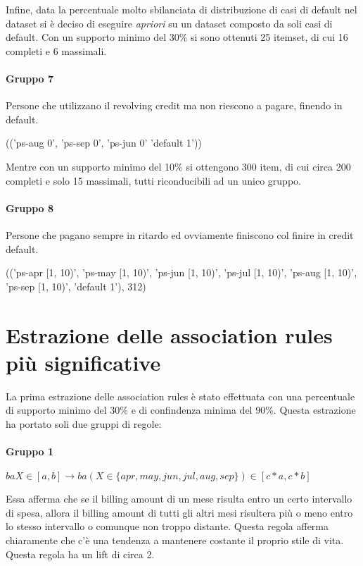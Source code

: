 Infine, data la percentuale molto sbilanciata di distribuzione di casi di default
nel dataset si \`e deciso di eseguire \textit{apriori} su un dataset composto
da soli casi di default. Con un supporto minimo del 30\% si sono ottenuti 25 itemset,
di cui 16 completi e 6 massimali.


\paragraph{Gruppo 7}
Persone che utilizzano il revolving credit ma non riescono a pagare, finendo
in default.

\begin{center}
	(('ps-aug 0', 'ps-sep 0', 'ps-jun 0' 'default 1'))
\end{center}

Mentre con un supporto minimo del 10\% si ottengono 300 item, di cui circa 200 completi
e solo 15 massimali, tutti riconducibili ad un unico gruppo.

\paragraph{Gruppo 8}
Persone che pagano sempre in ritardo ed ovviamente finiscono col finire in credit
default.

\begin{center}
	(('ps-apr [1, 10)', 'ps-may [1, 10)', 'ps-jun [1, 10)', 'ps-jul [1, 10)', 'ps-aug [1, 10)', 'ps-sep [1, 10)', 'default 1'), 312)
\end{center}

\section{Estrazione delle association rules pi\`u significative}
La prima estrazione delle association rules \`e stato effettuata con una percentuale
di supporto minimo del 30\% e di confindenza minima del 90\%. Questa estrazione ha portato
soli due gruppi di regole:

\paragraph{Gruppo 1}
\begin{center}
	$baX \in [a,b] \rightarrow ba(X \in \{apr,may,jun,jul,aug,sep\}) \in [c*a, c*b]$
\end{center}

Essa afferma che se il billing amount di un mese risulta entro un certo intervallo
di spesa, allora il billing amount di tutti gli altri mesi risultera pi\`u o 
meno entro lo stesso intervallo o comunque non troppo distante. Questa regola
afferma chiaramente che c'\`e una tendenza a mantenere costante il proprio stile
di vita. Questa regola ha un lift di circa 2.

